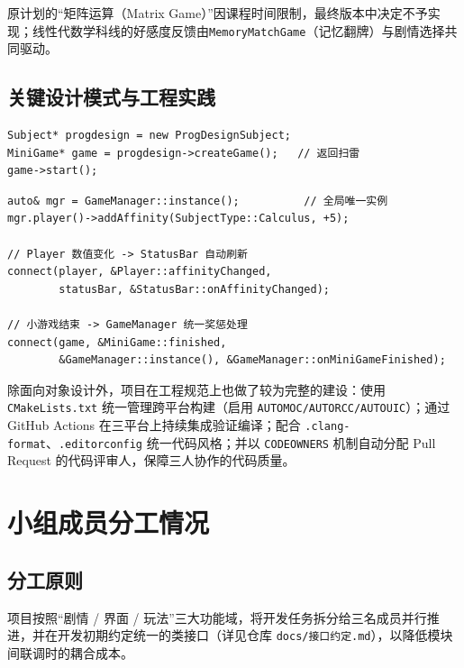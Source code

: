\documentclass[12pt]{article}
\newcommand{\module}[1]{\texttt{#1}}
\begin{document}
原计划的“矩阵运算（Matrix Game）”因课程时间限制，最终版本中决定不予实现；线性代数学科线的好感度反馈由\module{MemoryMatchGame}（记忆翻牌）与剧情选择共同驱动。

\subsection{关键设计模式与工程实践}
\begin{lstlisting}[caption={工厂模式：由学科对象创建对应的小游戏实例}]
Subject* progdesign = new ProgDesignSubject;
MiniGame* game = progdesign->createGame();   // 返回扫雷
game->start();
\end{lstlisting}

\begin{lstlisting}[caption={单例模式与信号槽解耦}]
auto& mgr = GameManager::instance();          // 全局唯一实例
mgr.player()->addAffinity(SubjectType::Calculus, +5);

// Player 数值变化 -> StatusBar 自动刷新
connect(player, &Player::affinityChanged,
        statusBar, &StatusBar::onAffinityChanged);

// 小游戏结束 -> GameManager 统一奖惩处理
connect(game, &MiniGame::finished,
        &GameManager::instance(), &GameManager::onMiniGameFinished);
\end{lstlisting}

除面向对象设计外，项目在工程规范上也做了较为完整的建设：使用 \texttt{CMakeLists.txt} 统一管理跨平台构建（启用 \texttt{AUTOMOC/AUTORCC/AUTOUIC}）；通过 GitHub Actions 在三平台上持续集成验证编译；配合 \texttt{.clang-format}、\texttt{.editorconfig} 统一代码风格；并以 \texttt{CODEOWNERS} 机制自动分配 Pull Request 的代码评审人，保障三人协作的代码质量。

\section{小组成员分工情况}

\subsection{分工原则}
项目按照“剧情 / 界面 / 玩法”三大功能域，将开发任务拆分给三名成员并行推进，并在开发初期约定统一的类接口（详见仓库 \texttt{docs/接口约定.md}），以降低模块间联调时的耦合成本。
\end{document}
